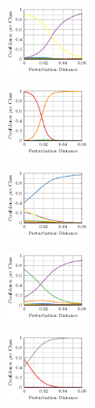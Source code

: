 \begin{figure}[t]
\begin{subfigure}{1\textwidth}
    \end{subfigure}
    \\[2px]
    \begin{subfigure}{0.19\textwidth}
        \includegraphics[height=2.2cm]{fig_cifar10_advtrain_5_adversarial}
    \end{subfigure}
    \begin{subfigure}{0.19\textwidth}
        \includegraphics[height=2.2cm]{fig_cifar10_advtrain_6_adversarial}
    \end{subfigure}
    \begin{subfigure}{0.19\textwidth}
        \includegraphics[height=2.2cm]{fig_cifar10_advtrain_7_adversarial}
    \end{subfigure}
    \begin{subfigure}{0.19\textwidth}
        \includegraphics[height=2.2cm]{fig_cifar10_advtrain_8_adversarial}
    \end{subfigure}
    \begin{subfigure}{0.19\textwidth}
        \includegraphics[height=2.2cm]{fig_cifar10_advtrain_9_adversarial}
    \end{subfigure}
    \\[4px]
    \begin{subfigure}{1\textwidth}

\end{subfigure}
\end{figure}
